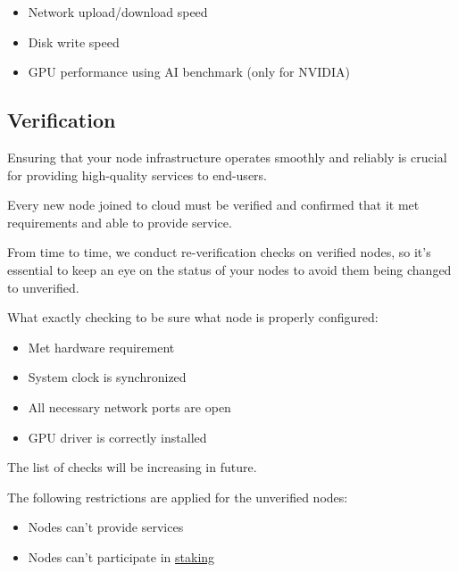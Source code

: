 \begin{itemize}
    \item Network upload/download speed
    \item Disk write speed
    \item GPU performance using AI benchmark (only for NVIDIA)
\end{itemize}

\subsection{Verification}

Ensuring that your node infrastructure operates smoothly and reliably is crucial for providing high-quality services to end-users.

Every new node joined to cloud must be verified and confirmed that it met requirements and able to provide service.

From time to time, we conduct re-verification checks on verified nodes, so it's essential to keep an eye on the status of your nodes to avoid them being changed to unverified.

What exactly checking to be sure what node is properly configured:

\begin{itemize}
    \item Met hardware requirement
    \item System clock is synchronized
    \item All necessary network ports are open
    \item GPU driver is correctly installed
\end{itemize}

The list of checks will be increasing in future.

The following restrictions are applied for the unverified nodes:

\begin{itemize}
    \item Nodes can't provide services
    \item Nodes can't participate in \hyperref[sec:staking]{staking}
\end{itemize}

